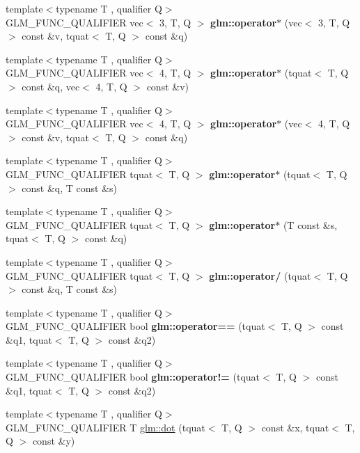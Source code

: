 \begin{DoxyCompactItemize}
\item 
{\footnotesize template$<$typename T , qualifier Q$>$ }\\G\+L\+M\+\_\+\+F\+U\+N\+C\+\_\+\+Q\+U\+A\+L\+I\+F\+I\+ER vec$<$ 3, T, Q $>$ {\bfseries glm\+::operator$\ast$} (vec$<$ 3, T, Q $>$ const \&v, tquat$<$ T, Q $>$ const \&q)
\item 
{\footnotesize template$<$typename T , qualifier Q$>$ }\\G\+L\+M\+\_\+\+F\+U\+N\+C\+\_\+\+Q\+U\+A\+L\+I\+F\+I\+ER vec$<$ 4, T, Q $>$ {\bfseries glm\+::operator$\ast$} (tquat$<$ T, Q $>$ const \&q, vec$<$ 4, T, Q $>$ const \&v)
\item 
{\footnotesize template$<$typename T , qualifier Q$>$ }\\G\+L\+M\+\_\+\+F\+U\+N\+C\+\_\+\+Q\+U\+A\+L\+I\+F\+I\+ER vec$<$ 4, T, Q $>$ {\bfseries glm\+::operator$\ast$} (vec$<$ 4, T, Q $>$ const \&v, tquat$<$ T, Q $>$ const \&q)
\item 
{\footnotesize template$<$typename T , qualifier Q$>$ }\\G\+L\+M\+\_\+\+F\+U\+N\+C\+\_\+\+Q\+U\+A\+L\+I\+F\+I\+ER tquat$<$ T, Q $>$ {\bfseries glm\+::operator$\ast$} (tquat$<$ T, Q $>$ const \&q, T const \&s)
\item 
{\footnotesize template$<$typename T , qualifier Q$>$ }\\G\+L\+M\+\_\+\+F\+U\+N\+C\+\_\+\+Q\+U\+A\+L\+I\+F\+I\+ER tquat$<$ T, Q $>$ {\bfseries glm\+::operator$\ast$} (T const \&s, tquat$<$ T, Q $>$ const \&q)
\item 
{\footnotesize template$<$typename T , qualifier Q$>$ }\\G\+L\+M\+\_\+\+F\+U\+N\+C\+\_\+\+Q\+U\+A\+L\+I\+F\+I\+ER tquat$<$ T, Q $>$ {\bfseries glm\+::operator/} (tquat$<$ T, Q $>$ const \&q, T const \&s)
\item 
{\footnotesize template$<$typename T , qualifier Q$>$ }\\G\+L\+M\+\_\+\+F\+U\+N\+C\+\_\+\+Q\+U\+A\+L\+I\+F\+I\+ER bool {\bfseries glm\+::operator==} (tquat$<$ T, Q $>$ const \&q1, tquat$<$ T, Q $>$ const \&q2)
\item 
{\footnotesize template$<$typename T , qualifier Q$>$ }\\G\+L\+M\+\_\+\+F\+U\+N\+C\+\_\+\+Q\+U\+A\+L\+I\+F\+I\+ER bool {\bfseries glm\+::operator!=} (tquat$<$ T, Q $>$ const \&q1, tquat$<$ T, Q $>$ const \&q2)
\item 
{\footnotesize template$<$typename T , qualifier Q$>$ }\\G\+L\+M\+\_\+\+F\+U\+N\+C\+\_\+\+Q\+U\+A\+L\+I\+F\+I\+ER T \hyperlink{group__gtc__quaternion_gab219911644fdc694e7d275cfcf35bfca}{glm\+::dot} (tquat$<$ T, Q $>$ const \&x, tquat$<$ T, Q $>$ const \&y)

\end{DoxyCompactItemize}
